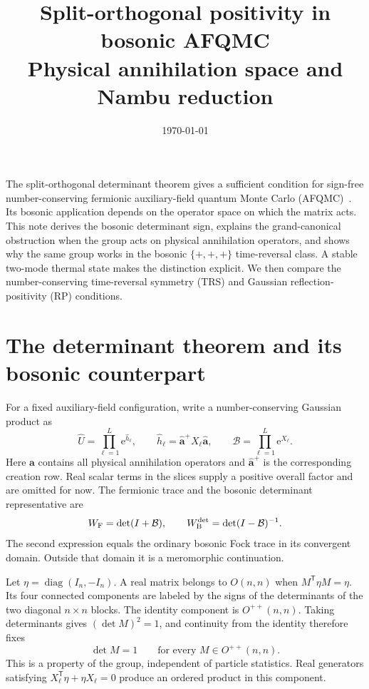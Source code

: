 \documentclass[11pt,a4paper]{article}
\title{Split-orthogonal positivity in bosonic AFQMC\\
    \large Physical annihilation space and Nambu reduction}
\author{}
\date{\today}
\newcommand{\diag}{\operatorname{diag}}
\newcommand{\ee}{\mathrm{e}}
\newcommand{\trans}{\mathsf{T}}
\newcommand{\mc}[1]{\mathcal{#1}}
\newcommand{\bb}[1]{\bm{#1}}
\begin{document}
\maketitle

The split-orthogonal determinant theorem gives a sufficient condition for
sign-free number-conserving fermionic auxiliary-field quantum Monte Carlo
(AFQMC)~\cite{wang2015prl}. Its bosonic application depends on the operator
space on which the matrix acts. This note derives the bosonic determinant
sign, explains the grand-canonical obstruction when the group acts on
physical annihilation operators, and shows why the same group works in the
bosonic $\{+,+,+\}$ time-reversal class. A stable two-mode thermal state makes
the distinction explicit. We then compare the number-conserving
time-reversal symmetry (TRS) and Gaussian reflection-positivity (RP) conditions.

\section{The determinant theorem and its bosonic counterpart}

For a fixed auxiliary-field configuration, write a number-conserving Gaussian
product as
\begin{equation}
    \hat U=\prod_{\ell=1}^{L}\ee^{\hat h_\ell},
    \qquad
    \hat h_\ell=\hat{\bb a}^{+}X_\ell\hat{\bb a},
    \qquad
    \mc B=\prod_{\ell=1}^{L}\ee^{X_\ell}.
    \label{eq:number_product}
\end{equation}
Here $\hat{\bb a}$ contains all physical annihilation operators and
$\hat{\bb a}^{+}$ is the corresponding creation row. Real scalar terms
in the slices supply a positive overall factor and are omitted for now.
The fermionic trace and the bosonic determinant representative are
\begin{equation}
    W_{\rm F}=\det(I+\mc B),
    \qquad
    W_{\rm B}^{\rm det}=\det(I-\mc B)^{-1}.
    \label{eq:weights}
\end{equation}
The second expression equals the ordinary bosonic Fock trace in its
convergent domain. Outside that domain it is a meromorphic continuation.

Let $\eta=\diag(I_n,-I_n)$. A real matrix belongs to $O(n,n)$ when
$M^\trans\eta M=\eta$. Its four connected components are labeled by the
signs of the determinants of the two diagonal $n\times n$ blocks.
The identity component is $O^{++}(n,n)$. Taking determinants gives
$(\det M)^2=1$, and continuity from the identity therefore fixes
\begin{equation}
    \det M=1
    \qquad\text{for every }M\in O^{++}(n,n).
    \label{eq:unit_det}
\end{equation}
This is a property of the group, independent of particle statistics.
Real generators satisfying
$X_\ell^\trans\eta+\eta X_\ell=0$ produce an ordered product in this component.
\end{document}
